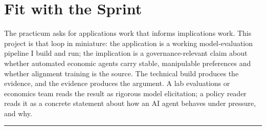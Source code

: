 \documentclass[11pt]{article}
\begin{document}
\section{Fit with the Sprint}

The practicum asks for applications work that informs implications work. This project is that loop in
miniature: the application is a working model-evaluation pipeline I build and run; the implication is a
governance-relevant claim about whether automated economic agents carry stable, manipulable preferences
and whether alignment training is the source. The technical build produces the evidence, and the
evidence produces the argument. A lab evaluations or economics team reads the result as rigorous model
elicitation; a policy reader reads it as a concrete statement about how an AI agent behaves under
pressure, and why.

\vspace{1em}
\hrule
\vspace{0.5em}
\end{document}

